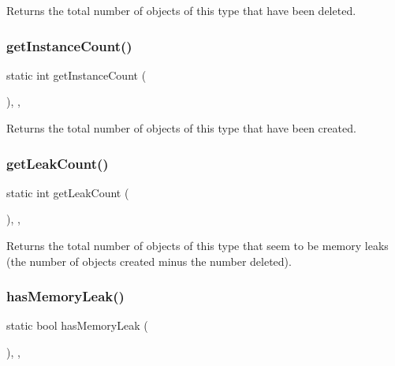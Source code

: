 Returns the total number of objects of this type that have been deleted. 

\mbox{\label{classManaged_ae7adc08acbd8f6db8e7b98ad0709d9f4}} 
\subsubsection{\texorpdfstring{get\+Instance\+Count()}{getInstanceCount()}}
{\footnotesize\ttfamily static int get\+Instance\+Count (\begin{DoxyParamCaption}{ }\end{DoxyParamCaption})\hspace{0.3cm}{\ttfamily [inline]}, {\ttfamily [static]}, {\ttfamily [protected]}}



Returns the total number of objects of this type that have been created. 

\mbox{\label{classManaged_ad6fcbfd737c828fe9a7ed1a5008a2d56}} 
\subsubsection{\texorpdfstring{get\+Leak\+Count()}{getLeakCount()}}
{\footnotesize\ttfamily static int get\+Leak\+Count (\begin{DoxyParamCaption}{ }\end{DoxyParamCaption})\hspace{0.3cm}{\ttfamily [inline]}, {\ttfamily [static]}, {\ttfamily [protected]}}



Returns the total number of objects of this type that seem to be memory leaks (the number of objects created minus the number deleted). 

\mbox{\label{classManaged_a0f7c4d11f087bd2ca4b2499e163b6285}} 
\subsubsection{\texorpdfstring{has\+Memory\+Leak()}{hasMemoryLeak()}}
{\footnotesize\ttfamily static bool has\+Memory\+Leak (\begin{DoxyParamCaption}{ }\end{DoxyParamCaption})\hspace{0.3cm}{\ttfamily [inline]}, {\ttfamily [static]}, {\ttfamily [protected]}}



